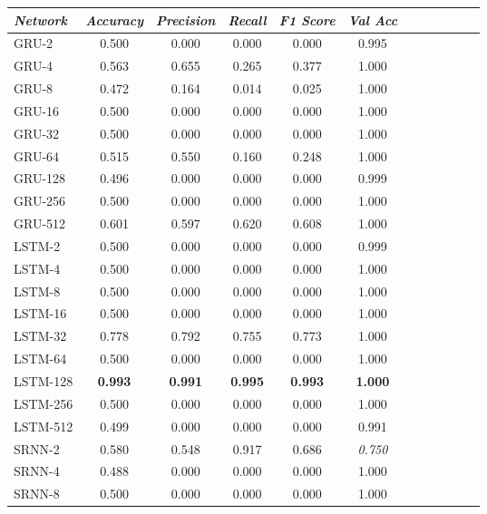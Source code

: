 \begin{table}
\begin{tabularx}{\textwidth}{@{}l*{10}{C}c@{}}
\toprule
  \textit{Network} &  \textit{Accuracy} &  \textit{Precision} &  \textit{Recall} &  \textit{F1 Score} &  \textit{Val Acc} \\
 \midrule
    GRU-2 &     0.500 &      0.000 &   0.000 &     0.000 &    0.995 \\
    GRU-4 &     0.563 &      0.655 &   0.265 &     0.377 &    1.000 \\
    GRU-8 &     0.472 &      0.164 &   0.014 &     0.025 &    1.000 \\
   GRU-16 &     0.500 &      0.000 &   0.000 &     0.000 &    1.000 \\
   GRU-32 &     0.500 &      0.000 &   0.000 &     0.000 &    1.000 \\
   GRU-64 &     0.515 &      0.550 &   0.160 &     0.248 &    1.000 \\
  GRU-128 &     0.496 &      0.000 &   0.000 &     0.000 &    0.999 \\
  GRU-256 &     0.500 &      0.000 &   0.000 &     0.000 &    1.000 \\
  GRU-512 &     0.601 &      0.597 &   0.620 &     0.608 &    1.000 \\
   LSTM-2 &     0.500 &      0.000 &   0.000 &     0.000 &    0.999 \\
   LSTM-4 &     0.500 &      0.000 &   0.000 &     0.000 &    1.000 \\
   LSTM-8 &     0.500 &      0.000 &   0.000 &     0.000 &    1.000 \\
  LSTM-16 &     0.500 &      0.000 &   0.000 &     0.000 &    1.000 \\
  LSTM-32 &     0.778 &      0.792 &   0.755 &     0.773 &    1.000 \\
  LSTM-64 &     0.500 &      0.000 &   0.000 &     0.000 &    1.000 \\
 LSTM-128 &     \textbf{0.993} &      \textbf{0.991} &   \textbf{0.995} &     \textbf{0.993} &    \textbf{1.000} \\
 LSTM-256 &     0.500 &      0.000 &   0.000 &     0.000 &    1.000 \\
 LSTM-512 &     0.499 &      0.000 &   0.000 &     0.000 &    0.991 \\
   SRNN-2 &     0.580 &      0.548 &   0.917 &     0.686 &    \textit{0.750} \\
   SRNN-4 &     0.488 &      0.000 &   0.000 &     0.000 &    1.000 \\
   SRNN-8 &     0.500 &      0.000 &   0.000 &     0.000 &    1.000 \\

\end{tabularx}
\end{table}
